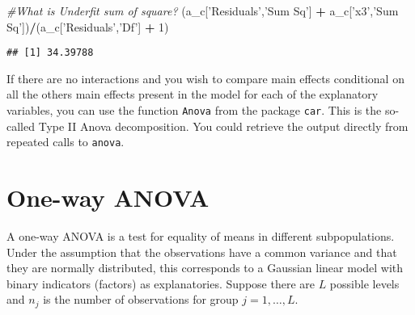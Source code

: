 \documentclass[]{book}
\newenvironment{Shaded}{\begin{snugshade}}{\end{snugshade}}
\newcommand{\CommentTok}[1]{\textcolor[rgb]{0.56,0.35,0.01}{\textit{#1}}}
\newcommand{\DecValTok}[1]{\textcolor[rgb]{0.00,0.00,0.81}{#1}}
\newcommand{\NormalTok}[1]{#1}
\newcommand{\OperatorTok}[1]{\textcolor[rgb]{0.81,0.36,0.00}{\textbf{#1}}}
\newcommand{\StringTok}[1]{\textcolor[rgb]{0.31,0.60,0.02}{#1}}
\theoremstyle{definition}
\theoremstyle{definition}
\theoremstyle{definition}
\theoremstyle{remark}
\begin{document}
\begin{Shaded}
\begin{Highlighting}[]
\CommentTok{#What is Underfit sum of square?}
\NormalTok{(a_c[}\StringTok{'Residuals'}\NormalTok{,}\StringTok{'Sum Sq'}\NormalTok{] }\OperatorTok{+}\StringTok{ }\NormalTok{a_c[}\StringTok{'x3'}\NormalTok{,}\StringTok{'Sum Sq'}\NormalTok{])}\OperatorTok{/}\NormalTok{(a_c[}\StringTok{'Residuals'}\NormalTok{,}\StringTok{'Df'}\NormalTok{] }\OperatorTok{+}\StringTok{ }\DecValTok{1}\NormalTok{)}
\end{Highlighting}
\end{Shaded}

\begin{verbatim}
## [1] 34.39788
\end{verbatim}

If there are no interactions and you wish to compare main effects conditional on all the others main effects present in the model for each of the explanatory variables, you can use the function \texttt{Anova} from the package \texttt{car}. This is the so-called Type II Anova decomposition. You could retrieve the output directly from repeated calls to \texttt{anova}.

\hypertarget{one-way-anova}{%
\section{One-way ANOVA}\label{one-way-anova}}

A one-way ANOVA is a test for equality of means in different subpopulations. Under the assumption that the observations have a common variance and that they are normally distributed, this corresponds to a Gaussian linear model with binary indicators (factors) as explanatories.
Suppose there are \(L\) possible levels and \(n_j\) is the number of observations for group \(j=1,\ldots, L\).
\end{document}
